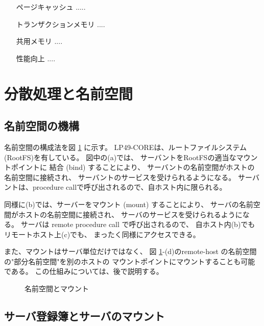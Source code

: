 \documentclass[draft]{ipsjpapers}
\begin{document}
\begin{itemize}
\item[ページキャッシュ]  .....

\item[トランザクションメモリ]  ....

\item[共用メモリ] ....

\item[性能向上]  ....
\end{itemize}



\section{分散処理と名前空間}
\subsection{名前空間の機構}

名前空間の構成法を図 \ref{fig:NSmount} に示す。
LP49-COREは、ルートファイルシステム(RootFS)を有している。
図中の(a)では、
サーバントをRootFSの適当なマウントポイントに
結合 (bind) することにより、
サーバントの名前空間がホストの名前空間に接続され、
サーバントのサービスを受けられるようになる。
サーバントは、procedure callで呼び出されるので、自ホスト内に限られる。

同様に(b)では、サーバーをマウント (mount) することにより、
サーバの名前空間がホストの名前空間に接続され、  
サーバのサービスを受けられるようになる。    
サーバは remote procedure call で呼び出されるので、
自ホスト内(b)でもリモートホスト上(c)でも、
まったく同様にアクセスできる。

また、マウントはサーバ単位だけではなく、
図 \ref{fig:NSmount}-(d)のremote-host の名前空間の"部分名前空間"を別のホストの
マウントポイントにマウントすることも可能である。
この仕組みについては、後で説明する。


\begin{figure}[htb]
  \begin{center}
   \epsfxsize=340pt
    \caption{名前空間とマウント}
    \label{fig:NSmount}
  \end{center}
\end{figure}



\subsection{サーバ登録簿とサーバのマウント}
\end{document}
